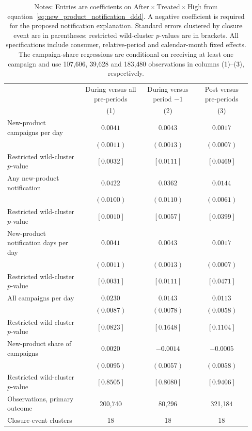 \documentclass[11 pt]{article}
\newcommand\fnote[1]{\captionsetup{font=footnotesize}\caption*{#1}}
\begin{document}
\begin{table}[!ht]
\centering
\caption{Differential exposure to new-product notifications}
\label{tab:appendix_new_product_notifications}
\scriptsize
\begin{tabularx}{\textwidth}{Xccc}
\toprule
 & During versus all pre-periods & During versus period $-1$ & Post versus pre-periods \\
 & (1) & (2) & (3) \\
\midrule
New-product campaigns per day & $0.0041$ & $0.0043$ & $0.0017$ \\
 & $(0.0011)$ & $(0.0013)$ & $(0.0007)$ \\
Restricted wild-cluster $p$-value & $[0.0032]$ & $[0.0111]$ & $[0.0469]$ \\
\addlinespace
Any new-product notification & $0.0422$ & $0.0362$ & $0.0144$ \\
 & $(0.0100)$ & $(0.0110)$ & $(0.0061)$ \\
Restricted wild-cluster $p$-value & $[0.0010]$ & $[0.0057]$ & $[0.0399]$ \\
\addlinespace
New-product notification days per day & $0.0041$ & $0.0043$ & $0.0017$ \\
 & $(0.0011)$ & $(0.0013)$ & $(0.0007)$ \\
Restricted wild-cluster $p$-value & $[0.0031]$ & $[0.0111]$ & $[0.0471]$ \\
\addlinespace
All campaigns per day & $0.0230$ & $0.0143$ & $0.0113$ \\
 & $(0.0087)$ & $(0.0078)$ & $(0.0058)$ \\
Restricted wild-cluster $p$-value & $[0.0823]$ & $[0.1648]$ & $[0.1104]$ \\
\addlinespace
New-product share of campaigns & $0.0020$ & $-0.0014$ & $-0.0005$ \\
 & $(0.0095)$ & $(0.0057)$ & $(0.0058)$ \\
Restricted wild-cluster $p$-value & $[0.8505]$ & $[0.8080]$ & $[0.9406]$ \\
\addlinespace
Observations, primary outcome & 200,740 & 80,296 & 321,184 \\
Closure-event clusters & 18 & 18 & 18 \\
\bottomrule
\end{tabularx}
\vspace{1mm}
\fnote{Notes: Entries are coefficients on $\text{After}\times\text{Treated}\times\text{High}$ from equation~\eqref{eq:new_product_notification_ddd}. A negative coefficient is required for the proposed notification explanation. Standard errors clustered by closure event are in parentheses; restricted wild-cluster $p$-values are in brackets. All specifications include consumer, relative-period and calendar-month fixed effects. The campaign-share regressions are conditional on receiving at least one campaign and use 107,606, 39,628 and 183,480 observations in columns (1)--(3), respectively.}
\end{table}
\end{document}
